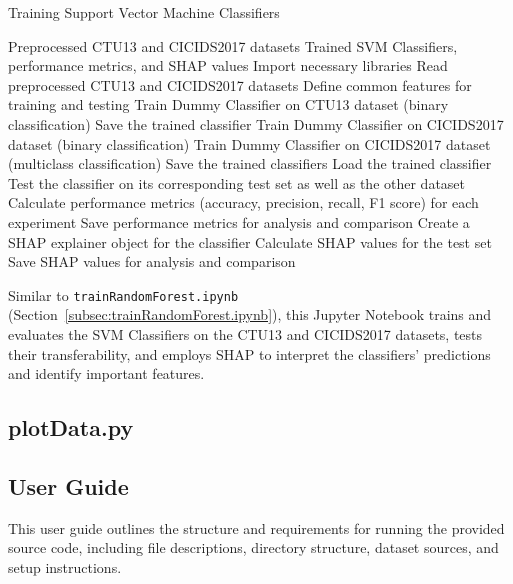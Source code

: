 \begin{algorithm}[H]
\caption{Training Support Vector Machine Classifiers}\label{alg:trainSVM} 
\begin{algorithmic}[1]
\Require%
Preprocessed CTU13 and CICIDS2017 datasets
\Ensure%
Trained SVM Classifiers, performance metrics, and SHAP values  
\State%
Import necessary libraries
\State%
Read preprocessed CTU13 and CICIDS2017 datasets
\State%
Define common features for training and testing
        \State%
        Train Dummy Classifier on CTU13 dataset (binary classification)
        \State%
        Save the trained classifier
        \State%
        Train Dummy Classifier on CICIDS2017 dataset (binary classification)
        \State%
        Train Dummy Classifier on CICIDS2017 dataset (multiclass classification)
        \State%
        Save the trained classifiers
    \EndIf%
\EndFor%
    \State%
    Load the trained classifier
    \State%
    Test the classifier on its corresponding test set as well as the other dataset
    \State%
    Calculate performance metrics (accuracy, precision, recall, F1 score) for each experiment
    \State%
    Save performance metrics for analysis and comparison
    \State%
    Create a SHAP explainer object for the classifier
    \State%
    Calculate SHAP values for the test set
    \State%
    Save SHAP values for analysis and comparison
\EndFor%
\end{algorithmic}
\end{algorithm}

Similar to \texttt{trainRandomForest.ipynb} (Section~\ref{subsec:trainRandomForest.ipynb}), this Jupyter Notebook trains and evaluates the SVM Classifiers on the CTU13 and CICIDS2017 datasets, tests their transferability, and employs SHAP to interpret the classifiers' predictions and identify important features.

\subsection{plotData.py}\label{subsec:plotData.py}



\subsection{User Guide}\label{subsec:user-guide}

This user guide outlines the structure and requirements for running the provided source code, including file descriptions, directory structure, dataset sources, and setup instructions.

